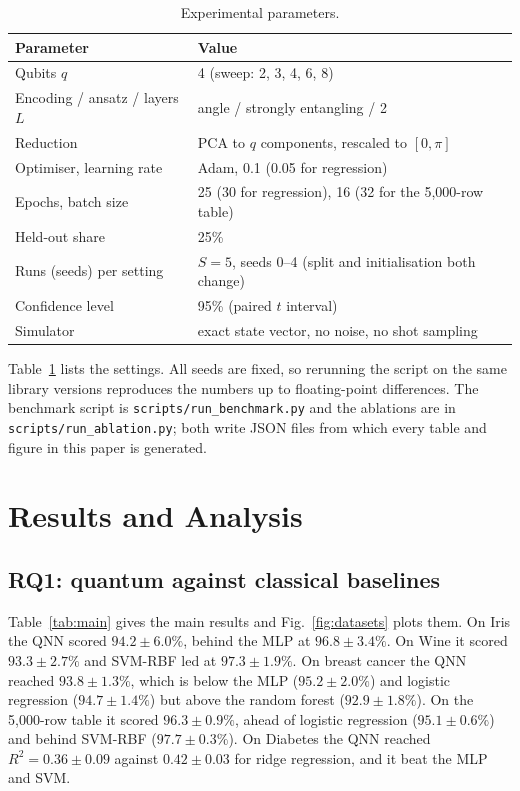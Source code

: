 \documentclass[12pt,onecolumn,draftclsnofoot]{IEEEtran}
\begin{document}
\begin{table}[!t]
\caption{Experimental parameters.}
\label{tab:params}
\centering\small
\begin{tabular}{ll}
\toprule
Parameter & Value\\
\midrule
Qubits $q$ & 4 (sweep: 2, 3, 4, 6, 8)\\
Encoding / ansatz / layers $L$ & angle / strongly entangling / 2\\
Reduction & PCA to $q$ components, rescaled to $[0,\pi]$\\
Optimiser, learning rate & Adam, 0.1 (0.05 for regression)\\
Epochs, batch size & 25 (30 for regression), 16 (32 for the 5,000-row table)\\
Held-out share & 25\%\\
Runs (seeds) per setting & $S=5$, seeds 0--4 (split and initialisation both change)\\
Confidence level & 95\% (paired $t$ interval)\\
Simulator & exact state vector, no noise, no shot sampling\\
\bottomrule
\end{tabular}
\end{table}

Table~\ref{tab:params} lists the settings. All seeds are fixed, so rerunning the script on the same library versions reproduces the numbers up to floating-point differences. The benchmark script is \texttt{scripts/run\_benchmark.py} and the ablations are in \texttt{scripts/run\_ablation.py}; both write JSON files from which every table and figure in this paper is generated.

\section{Results and Analysis}
\subsection{RQ1: quantum against classical baselines}
Table~\ref{tab:main} gives the main results and Fig.~\ref{fig:datasets} plots them. On Iris the QNN scored $94.2\pm6.0\%$, behind the MLP at $96.8\pm3.4\%$. On Wine it scored $93.3\pm2.7\%$ and SVM-RBF led at $97.3\pm1.9\%$. On breast cancer the QNN reached $93.8\pm1.3\%$, which is below the MLP ($95.2\pm2.0\%$) and logistic regression ($94.7\pm1.4\%$) but above the random forest ($92.9\pm1.8\%$). On the 5,000-row table it scored $96.3\pm0.9\%$, ahead of logistic regression ($95.1\pm0.6\%$) and behind SVM-RBF ($97.7\pm0.3\%$). On Diabetes the QNN reached $R^2=0.36\pm0.09$ against $0.42\pm0.03$ for ridge regression, and it beat the MLP and SVM.
\end{document}
